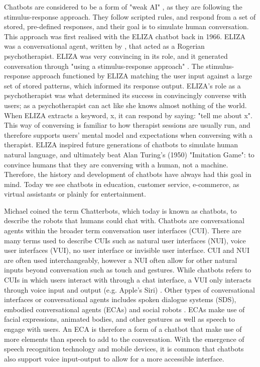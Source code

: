 Chatbots are considered to be a form of "weak AI" \citep{DeAngeli2008}, as they are following the stimulus-response approach. They follow scripted rules, and respond from a set of stored, pre-defined responses, and their goal is to simulate human conversation. This approach was first realised with the ELIZA chatbot back in 1966. ELIZA was a conversational agent, written by \cite{Weizenbaum1966}, that acted as a Rogerian psychotherapist. ELIZA was very convincing in its role, and it generated conversation through "using a stimulus-response approach" \citep[: 57]{McTear2016b}. The stimulus-response approach functioned by ELIZA matching the user input against a large set of stored patterns, which informed its response output. ELIZA's role as a psychotherapist was what determined its success in convincingly converse with users; as a psychotherapist can act like she knows almost nothing of the world. When ELIZA extracts a keyword, x, it can respond by saying: "tell me about x". This way of conversing is familiar to how therapist sessions are usually run, and therefore supports users' mental model and expectations when conversing with a therapist. ELIZA inspired future generations of chatbots to simulate human natural language, and ultimately beat Alan Turing's (1950) "Imitation Game": to convince humans that they are conversing with a human, not a machine. Therefore, the history and development of chatbots have always had this goal in mind. Today we see chatbots in education, customer service, e-commerce, as virtual assistants or plainly for entertainment. 

Michael \cite{Mauldin1994} coined the term Chatterbots, which today is known as chatbots, to describe the robots that humans could chat with. Chatbots are conversational agents within the broader term conversation user interfaces (CUI). There are many terms used to describe CUIs such as natural user interfaces (NUI), voice user interfaces (VUI), no user interface or invisible user interface.  CUI and NUI are often used interchangeably, however a NUI often allow for other natural inputs beyond conversation such as touch and gestures. While chatbots refers to CUIs in which users interact with through a chat interface, a VUI only interacts through voice input and output (e.g. Apple's Siri) \citep{Pearl2017}. Other types of conversational interfaces or conversational agents includes spoken dialogue systems (SDS), embodied conversational agents (ECAs) and social robots \citep{McTear2016b}. ECAs make use of facial expressions, animated bodies, and other gestures as well as speech to engage with users. An ECA is therefore a form of a chatbot that make use of more elements than speech to add to the conversation. With the emergence of speech recognition technology and mobile devices, it is common that chatbots also support voice input-output to allow for a more accessible interface.

